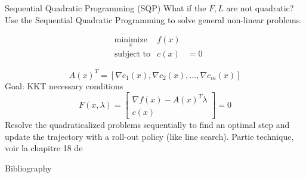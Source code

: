 \documentclass{beamer}
\begin{document}
\begin{frame}	{Sequential Quadratic Programming (SQP)}
What if the $F, L$ are not quadratic? Use the Sequential Quadratic Programming to solve general non-linear problems.

\begin{equation}
\begin{aligned}
&\underset{x}{\text{minimize}}       &f(x) &\\
&\text{subject to}       &c(x) &= 0
\end{aligned}
\end{equation}

\begin{equation}
A(x)^T = [\nabla c_1(x), \nabla c_2(x),..., \nabla c_m(x)]
\end{equation}
Goal: KKT necessary conditions
\begin{equation}
F(x, \lambda) = \begin{bmatrix}
\nabla f(x) - A(x)^T \lambda \\
c(x)
\end{bmatrix} = 0
\end{equation}
Resolve the quadraticalized problems sequentially to find an optimal step and update the trajectory with a roll-out policy (like line search). 
\color{gray} \quad Partie technique, voir la chapitre 18 de  \cite{NoceWrig06}
\end{frame}

\begin{frame}{Bibliography}

{}

\end{frame}
\end{document}
